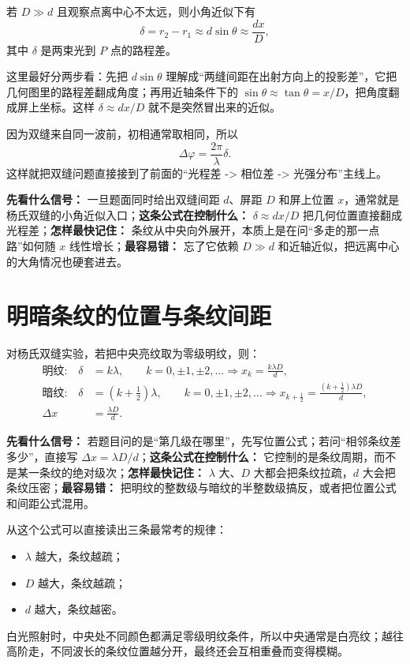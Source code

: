 \documentclass[lang=cn,11pt]{elegantbook}
\newcommand{\bridge}[1]{\begin{note}#1\end{note}}
\begin{document}
若 \(D\gg d\) 且观察点离中心不太远，则小角近似下有
\[
\delta=r_2-r_1\approx d\sin\theta\approx \frac{dx}{D},
\]
其中 \(\delta\) 是两束光到 \(P\) 点的路程差。

\bridge{这里最好分两步看：先把 \(d\sin\theta\) 理解成“两缝间距在出射方向上的投影差”，它把几何图里的路程差翻成角度；再用近轴条件下的 \(\sin\theta\approx\tan\theta=x/D\)，把角度翻成屏上坐标。这样 \(\delta\approx dx/D\) 就不是突然冒出来的近似。}

因为双缝来自同一波前，初相通常取相同，所以
\[
\Delta\varphi=\frac{2\pi}{\lambda}\delta.
\]
这样就把双缝问题直接接到了前面的“光程差 -> 相位差 -> 光强分布”主线上。

\begin{note}
\textbf{先看什么信号：} 一旦题面同时给出双缝间距 \(d\)、屏距 \(D\) 和屏上位置 \(x\)，通常就是杨氏双缝的小角近似入口；\textbf{这条公式在控制什么：} \(\delta\approx dx/D\) 把几何位置直接翻成光程差；\textbf{怎样最快记住：} 条纹从中央向外展开，本质上是在问“多走的那一点路”如何随 \(x\) 线性增长；\textbf{最容易错：} 忘了它依赖 \(D\gg d\) 和近轴近似，把远离中心的大角情况也硬套进去。
\end{note}

\section{明暗条纹的位置与条纹间距}

对杨氏双缝实验，若把中央亮纹取为零级明纹，则：
\[
\begin{aligned}
\text{明纹:}\quad
\delta&=k\lambda,\qquad k=0,\pm1,\pm2,\dots
\Longrightarrow
x_k=\frac{k\lambda D}{d},\\
\text{暗纹:}\quad
\delta&=\left(k+\frac12\right)\lambda,\qquad k=0,\pm1,\pm2,\dots
\Longrightarrow
x_{k+\frac12}=\frac{\left(k+\frac12\right)\lambda D}{d},\\
\Delta x&=\frac{\lambda D}{d}.
\end{aligned}
\]

\begin{note}
\textbf{先看什么信号：} 若题目问的是“第几级在哪里”，先写位置公式；若问“相邻条纹差多少”，直接写 \(\Delta x=\lambda D/d\)；\textbf{这条公式在控制什么：} 它控制的是条纹周期，而不是某一条纹的绝对级次；\textbf{怎样最快记住：} \(\lambda\) 大、\(D\) 大都会把条纹拉疏，\(d\) 大会把条纹压密；\textbf{最容易错：} 把明纹的整数级与暗纹的半整数级搞反，或者把位置公式和间距公式混用。
\end{note}

\begin{remark}
从这个公式可以直接读出三条最常考的规律：
\begin{itemize}
  \item \(\lambda\) 越大，条纹越疏；
  \item \(D\) 越大，条纹越疏；
  \item \(d\) 越大，条纹越密。
\end{itemize}
白光照射时，中央处不同颜色都满足零级明纹条件，所以中央通常是白亮纹；越往高阶走，不同波长的条纹位置越分开，最终还会互相重叠而变得模糊。
\end{remark}
\end{document}
